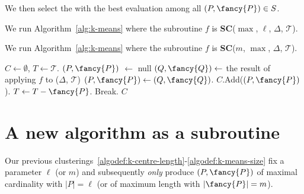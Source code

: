 \documentclass[english, thm-restate]{lipics-v2021}
\begin{document}
\noindent
We then select the \pathlet with the best evaluation among all $(P, {\fancy{P}}) \in S$. 
\noindent


\begin{algodef}
    \label{algodef:k-means-length}
    We run Algorithm~\ref{alg:k-means} where the subroutine $f$ is \textbf{SC}($\max$, $\ell$, $\Delta$, $\mathcal{T}$). 
\end{algodef}


\begin{algodef}
    \label{algodef:k-means-size}
     We run Algorithm~\ref{alg:k-means} where the subroutine $f$ is \textbf{SC}($m$, $\max$, $\Delta$, $\mathcal{T}$). 
\end{algodef}

 \begin{algorithm}[H]
    \caption{\texttt{k\_means}(\texttt{vector} $(c_1, c_2, c_3)$, \texttt{trajectory} $\mathcal{T}$, \texttt{subroutine} $f$) }
    \label{alg:k-means}
    \begin{algorithmic}
    \State $C \gets \emptyset$, $T \gets \mathcal{T}$.
    \State $(P, {\fancy{P}}) $ $\gets$ null
    \State $(Q, {\fancy{Q}}) \gets $ the result of applying $f$ to ($\Delta$, $\mathcal{T}$)
    \State $(P, {\fancy{P}}) \gets (Q, {\fancy{Q}})$. 
    \EndIf
    \EndFor
    \State $C$.Add($(P, {\fancy{P}})$).
    \State $T \gets T - {\fancy{P}}$.
    \Else
    \State Break.
    \EndIf
    \EndWhile
    \State \Return $C$
    \end{algorithmic}
  \end{algorithm}




\clearpage
\section{A new algorithm as a subroutine}
\label{sec:pareto}

Our previous clusterings~\ref{algodef:k-centre-length}-\ref{algodef:k-means-size} fix a parameter $\ell$ (or $m$) and subsequently  \emph{only} produce \pathlets $(P, {\fancy{P}})$ of maximal cardinality with  $|P| = \ell$ (or of maximum length with $| {\fancy{P}}| = m$). 
\end{document}
